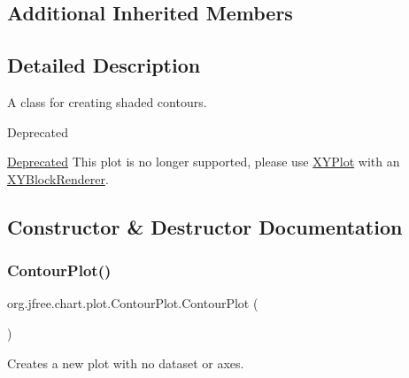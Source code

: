 \subsection*{Additional Inherited Members}


\subsection{Detailed Description}
A class for creating shaded contours.

\begin{DoxyRefDesc}{Deprecated}
\item[\mbox{\hyperlink{deprecated__deprecated000054}{Deprecated}}]This plot is no longer supported, please use \mbox{\hyperlink{classorg_1_1jfree_1_1chart_1_1plot_1_1_x_y_plot}{X\+Y\+Plot}} with an \mbox{\hyperlink{}{X\+Y\+Block\+Renderer}}. \end{DoxyRefDesc}


\subsection{Constructor \& Destructor Documentation}
\mbox{\label{classorg_1_1jfree_1_1chart_1_1plot_1_1_contour_plot_aaab1fe03b476140c69ec7f269e5b72f5}} 
\subsubsection{\texorpdfstring{Contour\+Plot()}{ContourPlot()}\hspace{0.1cm}{\footnotesize\ttfamily [1/2]}}
{\footnotesize\ttfamily org.\+jfree.\+chart.\+plot.\+Contour\+Plot.\+Contour\+Plot (\begin{DoxyParamCaption}{ }\end{DoxyParamCaption})}

Creates a new plot with no dataset or axes. \mbox{\label{classorg_1_1jfree_1_1chart_1_1plot_1_1_contour_plot_a5dca1e4ec8b0b8b8e455d709c90805ee}} 
